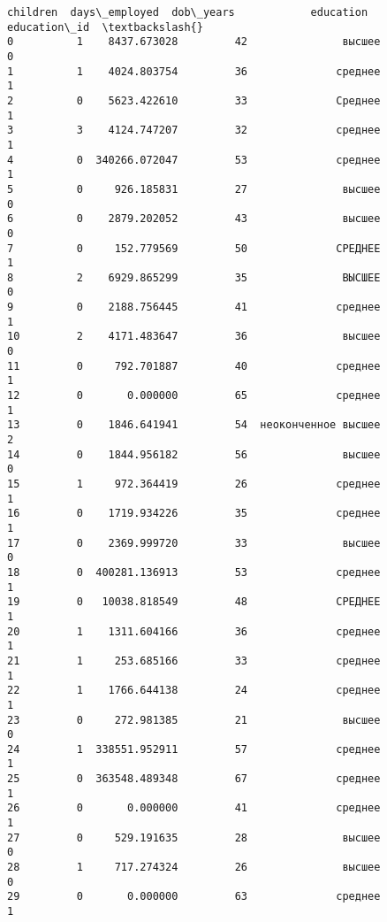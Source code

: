 \documentclass[11pt]{article}
\newcommand{\prompt}[4]{
        \llap{{\color{#2}[#3]: #4}}\vspace{-1.25em}
    }
\begin{document}
            \begin{tcolorbox}[breakable, boxrule=.5pt, size=fbox, pad at break*=1mm, opacityfill=0]
\prompt{Out}{outcolor}{123}{\hspace{3.5pt}}
\begin{Verbatim}[commandchars=\\\{\}]
    children  days\_employed  dob\_years            education  education\_id  \textbackslash{}
0          1    8437.673028         42               высшее             0
1          1    4024.803754         36              среднее             1
2          0    5623.422610         33              Среднее             1
3          3    4124.747207         32              среднее             1
4          0  340266.072047         53              среднее             1
5          0     926.185831         27               высшее             0
6          0    2879.202052         43               высшее             0
7          0     152.779569         50              СРЕДНЕЕ             1
8          2    6929.865299         35               ВЫСШЕЕ             0
9          0    2188.756445         41              среднее             1
10         2    4171.483647         36               высшее             0
11         0     792.701887         40              среднее             1
12         0       0.000000         65              среднее             1
13         0    1846.641941         54  неоконченное высшее             2
14         0    1844.956182         56               высшее             0
15         1     972.364419         26              среднее             1
16         0    1719.934226         35              среднее             1
17         0    2369.999720         33               высшее             0
18         0  400281.136913         53              среднее             1
19         0   10038.818549         48              СРЕДНЕЕ             1
20         1    1311.604166         36              среднее             1
21         1     253.685166         33              среднее             1
22         1    1766.644138         24              среднее             1
23         0     272.981385         21               высшее             0
24         1  338551.952911         57              среднее             1
25         0  363548.489348         67              среднее             1
26         0       0.000000         41              среднее             1
27         0     529.191635         28               высшее             0
28         1     717.274324         26               высшее             0
29         0       0.000000         63              среднее             1


\end{Verbatim}
\end{tcolorbox}
\end{document}
